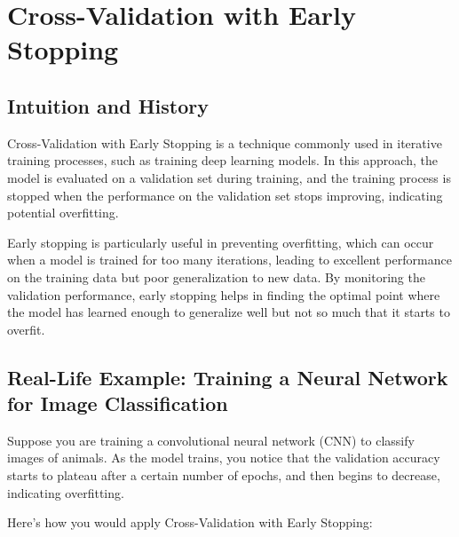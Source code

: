 \documentclass[10pt]{article}
\begin{document}
\section{Cross-Validation with Early Stopping}
\subsection{Intuition and History}
Cross-Validation with Early Stopping is a technique commonly used in iterative training processes, such as training deep learning models. In this approach, the model is evaluated on a validation set during training, and the training process is stopped when the performance on the validation set stops improving, indicating potential overfitting.

Early stopping is particularly useful in preventing overfitting, which can occur when a model is trained for too many iterations, leading to excellent performance on the training data but poor generalization to new data. By monitoring the validation performance, early stopping helps in finding the optimal point where the model has learned enough to generalize well but not so much that it starts to overfit.

\subsection{Real-Life Example: Training a Neural Network for Image Classification}
Suppose you are training a convolutional neural network (CNN) to classify images of animals. As the model trains, you notice that the validation accuracy starts to plateau after a certain number of epochs, and then begins to decrease, indicating overfitting.

Here’s how you would apply Cross-Validation with Early Stopping:
\end{document}
